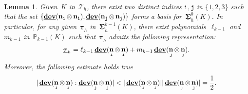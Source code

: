 \documentclass[a4paper,twoside,10pt]{article}
\theoremstyle{plain}
\newtheorem{lemma}[theorem]{Lemma}
\theoremstyle{remark}
\theoremstyle{definition}
\numberwithin{equation}{section}
\numberwithin{figure}{section}
\newcommand{\Pbbkmo}{\mathbb{P}_{k-1}}
\newcommand{\Tauh}{\mathcal{T}_h}
\newcommand{\K}{K}
\newcommand{\Sigmah}{\underline{\boldsymbol{\Sigma}}_h}
\newcommand{\Sigmahz}{\Sigmah^0}
\newcommand{\Sigmahkmo}{\Sigmah^{k-1}}
\newcommand{\taubfh}{\underline{\boldsymbol{\tau}}_h}
\DeclareMathOperator{\dev}{\underline{\mathbf{dev}}}
\DeclareMathOperator{\norm}{\bf{n}}
\newcommand{\lkmo}{\ell_{k-1}}
\newcommand{\mkmo}{m_{k-1}}
\newcommand{\itt}{\mathtt{i}}
\newcommand{\jtt}{\mathtt{j}}
\newcommand{\normitt}{\norm_{\itt}}
\newcommand{\normjtt}{\norm_{\jtt}}
\begin{document}
\begin{lemma} \label{lemma:dev-n1-n2-basis}
Given~$\K$ in~$\Tauh$,
there exist two distinct indices $\itt,\jtt$ in $\{1,2,3\}$
such that the set
$\{\dev(\normitt\otimes\normitt),\dev(\normjtt\otimes\normjtt)\}$
forms a basis for~$\Sigmahz(\K)$.
In particular,
for any given~$\taubfh$ in~$\Sigmahkmo(\K)$,
there exist polynomials~$\lkmo$ and~$\mkmo$ in~$\Pbbkmo(\K)$
such that~$\taubfh$ admits the following representation:
\begin{equation*}
\taubfh = \lkmo \dev(\normitt\otimes\normitt) + \mkmo \dev(\normjtt\otimes\normjtt).
\end{equation*}
Moreover,
the following estimate holds true
\begin{equation} \label{strict-CS}
|\dev(\normitt\otimes\normitt):\dev(\normjtt\otimes\normjtt)|
< |\dev(\normitt\otimes\normitt)||\dev(\normjtt\otimes\normjtt)|
= \frac12.
\end{equation}
\end{lemma}
\end{document}
